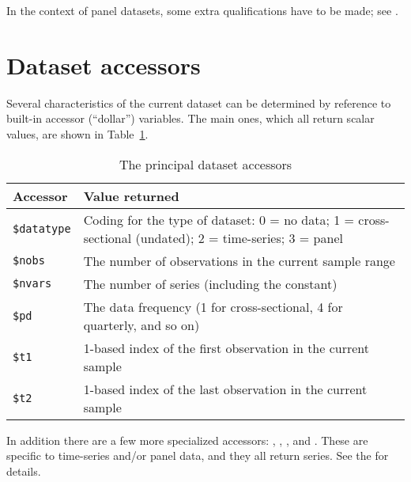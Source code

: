 In the context of panel datasets, some extra qualifications have to be
made; see \GUG.

\section{Dataset accessors}
\label{sec:accessors}

Several characteristics of the current dataset can be determined by
reference to built-in accessor (``dollar'') variables. The main ones,
which all return scalar values, are shown in
Table~\ref{tab:dataset-accessors}.

\begin{table}[htbp]
  \centering
  \begin{tabular}{lp{}}
    \textbf{Accessor} & \textbf{Value returned} \\ \hline
    \verb|$datatype| & Coding for the type of dataset: 
    0 = no data; 1 = cross-sectional (undated); 2 = time-series;
    3 = panel \\
    \verb|$nobs| & The number of observations in the current 
    sample range \\
    \verb|$nvars| & The number of series (including the constant)\\
    \verb|$pd| & The data frequency (1 for cross-sectional, 4 for
    quarterly, and so on) \\
    \verb|$t1| & 1-based index of the first observation in the
    current sample \\
    \verb|$t2| & 1-based index of the last observation in the
    current sample \\
    \hline
  \end{tabular}
  \caption{The principal dataset accessors}
  \label{tab:dataset-accessors}
\end{table}

In addition there are a few more specialized accessors:
, , ,
 and . These are specific to time-series
and/or panel data, and they all return series. See the \GCR{} for
details. 



